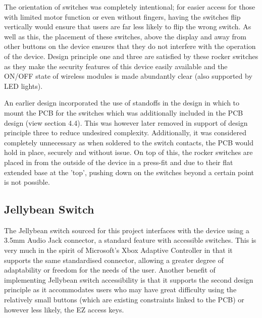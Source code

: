 The orientation of switches was completely intentional; for easier access for those with limited motor function or even without fingers, having the switches flip vertically would ensure that users are far less likely to flip the wrong switch.
As well as this, the placement of these switches, above the display and away from other buttons on the device ensures that they do not interfere with the operation of the device.
Design principle one and three are satisfied by these rocker switches as they make the security features of this device easily available and the ON/OFF state of wireless modules is made abundantly clear (also supported by LED lights).

An earlier design incorporated the use of standoffs in the design in which to mount the PCB for the switches which was additionally included in the PCB design (view section 4.4). %
This was however later removed in support of design principle three to reduce undesired complexity.
Additionally, it was considered completely unnecessary as when soldered to the switch contacts, the PCB would hold in place, securely and without issue.
On top of this, the rocker switches are placed in from the outside of the device in a press-fit and due to their flat extended base at the 'top', pushing down on the switches beyond a certain point is not possible.

\subsection{Jellybean Switch}

The Jellybean switch sourced for this project interfaces with the device using a 3.5mm Audio Jack connector, a standard feature with accessible switches.
This is very much in the spirit of Microsoft's Xbox Adaptive Controller\cite{adaptive} in that it supports the same standardised connector, allowing a greater degree of adaptability or freedom for the needs of the user.
Another benefit of implementing Jellybean switch accessibility is that it supports the second design principle as it accommodates users who may have great difficulty using the relatively small buttons (which are existing constraints linked to the PCB) or however less likely, the EZ access keys.

